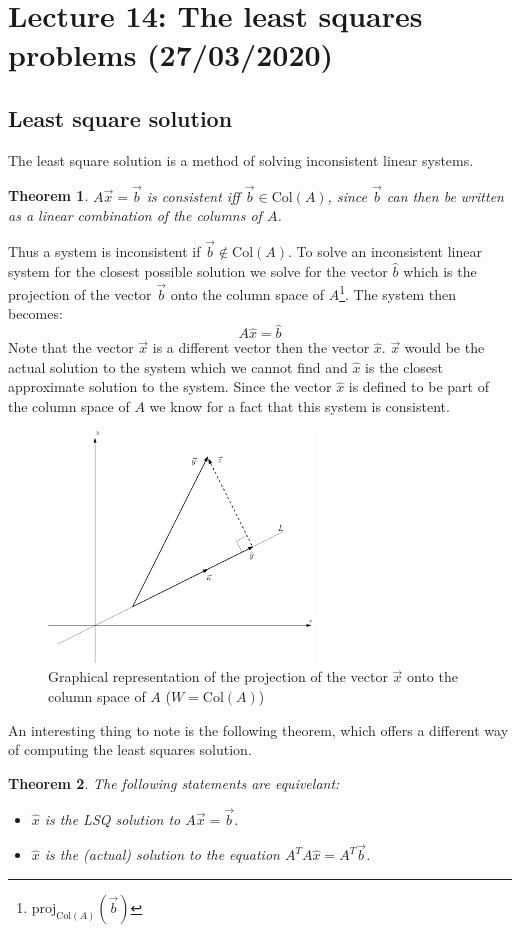 \documentclass[11pt, a4paper]{article}
\newtheorem{theorem}{Theorem}
\begin{document}
\setcounter{section}{13}
\section{Lecture 14: The least squares problems (27/03/2020)}
\subsection{Least square solution}
The least square solution is a method of solving inconsistent linear systems.
\begin{theorem}
  $A\vec{x}=\vec{b}$ is consistent iff $\vec{b}\in \text{Col}(A)$, since $\vec{b}$ can then be written as a linear combination of the columns of $A$.
\end{theorem}
Thus a system is inconsistent if $\vec{b} \notin \text{Col}(A)$. To solve an inconsistent linear system for the closest possible solution we solve for the vector $\hat{b}$ which is the projection of the vector $\vec{b}$ onto the column space of $A$\footnote{$\text{proj}_{\text{Col}(A)}(\vec{b})$}. The system then becomes:
\begin{equation}
  A\hat{x} = \hat{b}
\end{equation}
Note that the vector $\vec{x}$ is a different vector then the vector $\hat{x}$. $\vec{x}$ would be the actual solution to the system which we cannot find and $\hat{x}$ is the closest approximate solution to the system. Since the vector $\hat{x}$ is defined to be part of the column space of $A$ we know for a fact that this system is consistent.
\begin{figure}[h]
  \centerline{\includegraphics[width=70mm]{images/Projection.png}}
  \caption{Graphical representation of the projection of the vector $\vec{x}$ onto the column space of $A$ ($W = \text{Col}(A)$)}
\end{figure}
An interesting thing to note is the following theorem, which offers a different way of computing the least squares solution.
\begin{theorem}
  The following statements are equivelant:
  \begin{itemize}
    \item $\hat{x}$ is the LSQ solution to $A\vec{x} = \vec{b}$.
    \item $\hat{x}$ is the (actual) solution to the equation $A^TA\hat{x} = A^T\vec{b}$.
  \end{itemize}
\end{theorem}
\end{document}
